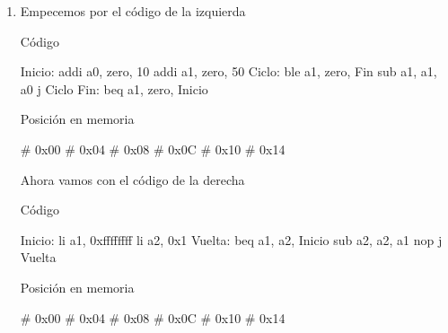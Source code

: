     \begin{enumerate}
    
        \item Empecemos por el código de la izquierda

        \setlength{\columnsep}{30pt} %
        \begin{multicols}{2}
            \begin{center}
                \large{Código}
            \end{center}
        \begin{riscv}
    Inicio: addi a0, zero, 10
    addi a1, zero, 50
    Ciclo: ble a1, zero, Fin
    sub a1, a1, a0
    j Ciclo
    Fin: beq a1, zero, Inicio
        \end{riscv}
        \columnbreak
        \begin{center}
            \large{Posición en memoria}
        \end{center}
        \begin{riscv}
    # 0x00
    # 0x04
    # 0x08
    # 0x0C
    # 0x10
    # 0x14
        \end{riscv}
    \end{multicols}

    Ahora vamos con el código de la derecha

    \setlength{\columnsep}{30pt} %
        \begin{paracol}{2}
            \begin{center}
                \large{Código}
            \end{center}
        \begin{riscv}
    Inicio: li a1, 0xffffffff
    li a2, 0x1
    Vuelta: beq a1, a2, Inicio
    sub a2, a2, a1
    nop
    j Vuelta
        \end{riscv}
        \switchcolumn
        \begin{center}
            \large{Posición en memoria}
        \end{center}
        \begin{riscv}
    # 0x00
    # 0x04
    # 0x08
    # 0x0C
    # 0x10
    # 0x14
        \end{riscv}
    \end{paracol}
        
    \end{enumerate}
    
